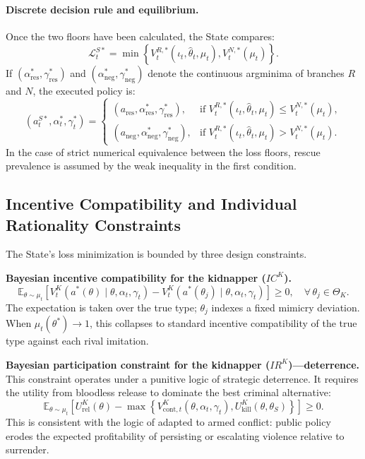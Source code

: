\documentclass[12pt,a4paper]{article}
\providecommand{\textcite}{\citet}
\theoremstyle{plain}
\theoremstyle{definition}
\theoremstyle{remark}
\newcommand{\1}{\mathbf{1}}
\begin{document}
\paragraph{Discrete decision rule and equilibrium.}
Once the two floors have been calculated, the State compares:
\begin{equation}
\label{eq:state-expected-loss}
\mathcal L_t^{S*}
=
\min\left\{
V_t^{R,*}(\iota_t,\hat{\theta}_t,\mu_t),
V_t^{N,*}(\mu_t)
\right\}.
\end{equation}
If $(\alpha_{\mathrm{res}}^*,\gamma_{\mathrm{res}}^*)$ and $(\alpha_{\mathrm{neg}}^*,\gamma_{\mathrm{neg}}^*)$ denote the continuous argminima of branches $R$ and $N$, the executed policy is:
\begin{equation}
\label{eq:state-discrete-rule}
(a_t^{S*},\alpha_t^*,\gamma_t^*)
=
\begin{cases}
(a_{\mathrm{res}},\alpha_{\mathrm{res}}^*,\gamma_{\mathrm{res}}^*),
& \text{if } V_t^{R,*}(\iota_t,\hat{\theta}_t,\mu_t)\le V_t^{N,*}(\mu_t),\\[6pt]
(a_{\mathrm{neg}},\alpha_{\mathrm{neg}}^*,\gamma_{\mathrm{neg}}^*),
& \text{if } V_t^{R,*}(\iota_t,\hat{\theta}_t,\mu_t)>V_t^{N,*}(\mu_t).
\end{cases}
\end{equation}
In the case of strict numerical equivalence between the loss floors, rescue prevalence is assumed by the weak inequality in the first condition.

\subsection{Incentive Compatibility and Individual Rationality Constraints}
\label{subsec:ir-ic}

The State's loss minimization is bounded by three design constraints.

\noindent\textbf{Bayesian incentive compatibility for the kidnapper ($IC^K$).}
\begin{equation}
\label{eq:ic-kidnapper}
\mathbb{E}_{\theta\sim\mu_t}
\left[V^K_t(a^*(\theta)\mid\theta,\alpha_t,\gamma_t)
-V^K_t(a^*(\theta_j)\mid\theta,\alpha_t,\gamma_t)\right]\ge0,
\quad\forall\,\theta_j\in\Theta_K.
\end{equation}
The expectation is taken over the true type; $\theta_j$ indexes a fixed mimicry
deviation. When $\mu_t(\theta^*)\to1$, this collapses to standard incentive
compatibility of the true type against each rival imitation.

\noindent\textbf{Bayesian participation constraint for the kidnapper ($IR^K$)---deterrence.}
This constraint operates under a punitive logic of strategic deterrence. It requires
the utility from bloodless release to dominate the best criminal alternative:
\begin{equation}
\label{eq:ir-K}
\mathbb{E}_{\theta\sim\mu_t}
\left[U^K_{\mathrm{rel}}(\theta)
-\max\!\left\{V^K_{\mathrm{cont},t}(\theta,\alpha_t,\gamma_t),
U^K_{\mathrm{kill}}(\theta,\theta_S)\right\}\right]\ge0.
\end{equation}
This is consistent with the logic of \textcite{Becker1968} adapted to armed conflict:
public policy erodes the expected profitability of persisting or escalating violence
relative to surrender.
\end{document}
